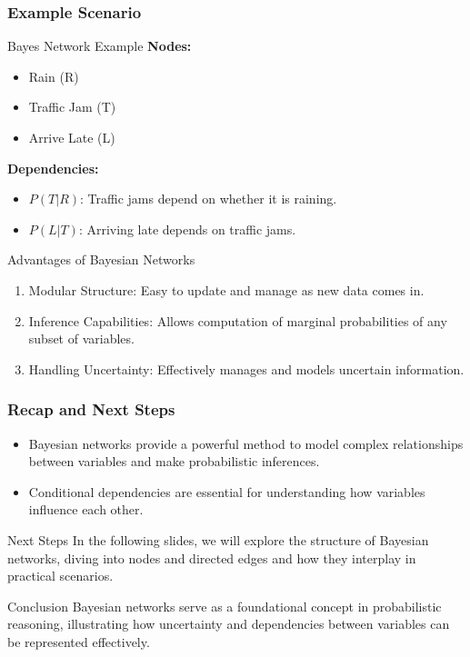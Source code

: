 \documentclass[aspectratio=169]{beamer}
\begin{document}
\begin{frame}[fragile]
    \frametitle{Example Scenario}
    \begin{block}{Bayes Network Example}
        \textbf{Nodes:}
        \begin{itemize}
            \item Rain (R)
            \item Traffic Jam (T)
            \item Arrive Late (L)
        \end{itemize}
        \textbf{Dependencies:}
        \begin{itemize}
            \item $P(T | R)$: Traffic jams depend on whether it is raining.
            \item $P(L | T)$: Arriving late depends on traffic jams.
        \end{itemize}
    \end{block}
    \begin{block}{Advantages of Bayesian Networks}
        \begin{enumerate}
            \item Modular Structure: Easy to update and manage as new data comes in.
            \item Inference Capabilities: Allows computation of marginal probabilities of any subset of variables.
            \item Handling Uncertainty: Effectively manages and models uncertain information.
        \end{enumerate}
    \end{block}
\end{frame}

\begin{frame}[fragile]
    \frametitle{Recap and Next Steps}
    \begin{itemize}
        \item Bayesian networks provide a powerful method to model complex relationships between variables and make probabilistic inferences.
        \item Conditional dependencies are essential for understanding how variables influence each other.
    \end{itemize}
    \begin{block}{Next Steps}
        In the following slides, we will explore the structure of Bayesian networks, diving into nodes and directed edges and how they interplay in practical scenarios.
    \end{block}
    \begin{block}{Conclusion}
        Bayesian networks serve as a foundational concept in probabilistic reasoning, illustrating how uncertainty and dependencies between variables can be represented effectively.
    \end{block}
\end{frame}
\end{document}
